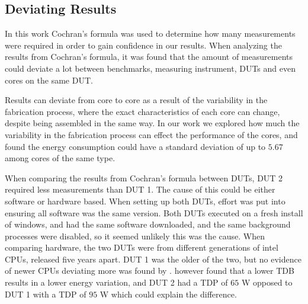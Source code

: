 \subsection{Deviating Results}

In this work Cochran's formula was used to determine how many measurements were required in order to gain confidence in our results. When analyzing the results from Cochran's formula, it was found that the amount of measurements could deviate a lot between benchmarks, measuring instrument, DUTs and even cores on the same DUT.

Results can deviate from core to core as a result of the variability in the fabrication process, where the exact characteristics of each core can change, despite being assembled in the same way.\cite{Mauzy2020} In our work we explored how much the variability in the fabrication process can effect the performance of the cores, and found the energy consumption could have a standard deviation of up to $5.67$ among cores of the same type.


When comparing the results from Cochran's formula between DUTs, DUT 2 required less measurements than DUT 1. The cause of this could be either software or hardware based. When setting up both DUTs, effort was put into ensuring all software was the same version. Both DUTs executed on a fresh install of windows, and had the same software downloaded, and the same background processes were disabled, so it seemed unlikely this was the cause. When comparing hardware, the two DUTs were from different generations of intel CPUs, released five years apart. DUT 1 was the older of the two, but no evidence of newer CPUs deviating more was found by \cite{Ournani2020}. \cite{Ournani2020} however found that a lower TDB results in a lower energy variation, and DUT 2 had a TDP of $65$ W opposed to DUT 1 with a TDP of $95$ W which could explain the difference\cite{IntelComparison}.





